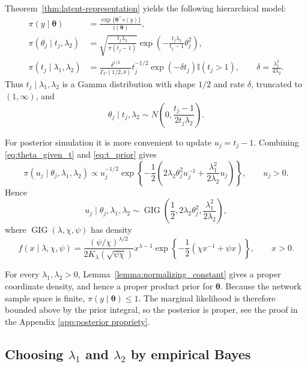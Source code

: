 \documentclass[preprint,12pt,authoryear]{elsarticle}
\def\th{\boldsymbol{\theta}}
\begin{document}
Theorem~\ref{thm:latent-representation} yields the following hierarchical model:
\begin{align}
    \pi(y \mid \th)
    &=
    \frac{\exp\{\th^\top s(y)\}}{z(\th)}, \\
    \pi(\theta_j \mid t_j,\lambda_2)
    &=
    \sqrt{\frac{t_j\lambda_2}{\pi(t_j-1)}}
    \exp\!\left(
    -\frac{t_j\lambda_2}{t_j-1}\theta_j^2
    \right),
    \label{eq:theta_given_t}\\
    \pi(t_j\mid \lambda_1,\lambda_2)
    &=
    \frac{\delta^{1/2}}{\Gamma_U(1/2,\delta)}
    t_j^{-1/2}\exp(-\delta t_j)\mathbb I(t_j>1),
    \qquad
    \delta=\frac{\lambda_1^2}{4\lambda_2}.
    \label{eq:t_prior}
\end{align}
Thus \(t_j\mid\lambda_1,\lambda_2\) is a Gamma distribution with shape \(1/2\) and rate \(\delta\), truncated to \((1,\infty)\), and
\[
\theta_j\mid t_j,\lambda_2
\sim
N\!\left(0,\frac{t_j-1}{2t_j\lambda_2}\right).
\]


For posterior simulation it is more convenient to update \(u_j=t_j-1\). Combining \eqref{eq:theta_given_t} and \eqref{eq:t_prior} gives
\[
\pi(u_j\mid \theta_j,\lambda_1,\lambda_2)
\propto
u_j^{-1/2}
\exp\!\left\{
-\frac12\left(
2\lambda_2\theta_j^2u_j^{-1}
+
\frac{\lambda_1^2}{2\lambda_2}u_j
\right)
\right\},
\qquad u_j>0.
\]
Hence
\begin{equation}\label{eq:gig_update}
u_j\mid \theta_j,\lambda_1,\lambda_2
\sim
\operatorname{GIG}
\left(
\frac12,
2\lambda_2\theta_j^2,
\frac{\lambda_1^2}{2\lambda_2}
\right),
\end{equation}
where \(\operatorname{GIG}(\lambda,\chi,\psi)\) has density \citep{jorgensen2012statistical}
\[
f(x\mid\lambda,\chi,\psi)
=
\frac{(\psi/\chi)^{\lambda/2}}
{2K_\lambda(\sqrt{\psi\chi})}
x^{\lambda-1}
\exp\!\left\{-\frac12(\chi x^{-1}+\psi x)\right\},
\qquad x>0.
\]


For every \(\lambda_1,\lambda_2>0\), Lemma~\ref{lemma:normalizing_constant}
gives a proper coordinate density, and hence a proper product prior for
\(\th\). Because the network sample space is finite, \(\pi(y\mid\th)\le 1\).
The marginal likelihood is therefore bounded above by the prior integral, so
the posterior is proper, see the proof in the Appendix \ref{app:posterior propriety}.




\subsection{Choosing \texorpdfstring{$\lambda_1$ and $\lambda_2$}{lambda1 and lambda2} by empirical Bayes}
\end{document}
